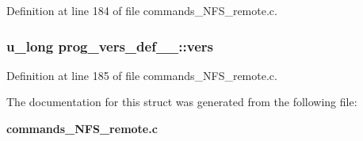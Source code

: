 Definition at line 184 of file commands\_\-NFS\_\-remote.c.
\subsubsection[{vers}]{\setlength{\rightskip}{0pt plus 5cm}u\_\-long {\bf prog\_\-vers\_\-def\_\-\_\-::vers}}\label{structprog__vers__def_____6d93603ec1877cfa946837bf5be6444f}




Definition at line 185 of file commands\_\-NFS\_\-remote.c.

The documentation for this struct was generated from the following file:\begin{CompactItemize}
\item 
{\bf commands\_\-NFS\_\-remote.c}\end{CompactItemize}
